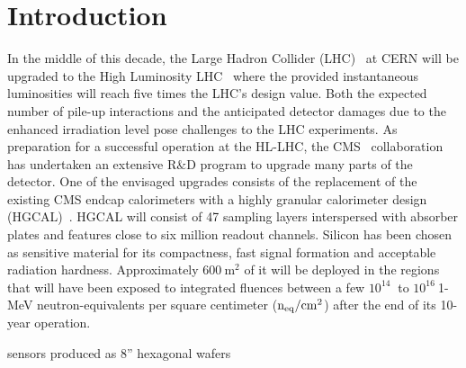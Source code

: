 \section{Introduction}
\label{sec:introduction}
In the middle of this decade, the Large Hadron Collider (LHC)~\cite{evans:2008} at CERN will be upgraded to the High Luminosity LHC~\cite{hl-lhc-tdr:2017} where the provided instantaneous luminosities will reach five times the LHC's design value.
Both the expected number of pile-up interactions and the anticipated detector damages due to the enhanced irradiation level pose challenges to the LHC experiments.\newline
As preparation for a successful operation at the HL-LHC, the CMS~\cite{cms:2008} collaboration has undertaken an extensive R$\&$D program to upgrade many parts of the detector.
One of the envisaged upgrades consists of the replacement of the existing CMS endcap calorimeters with a highly granular calorimeter design (HGCAL)~\cite{hgcal-tdr:2018}.
HGCAL will consist of 47 sampling layers interspersed with absorber plates and features close to six million readout channels.
Silicon has been chosen as sensitive material for its compactness, fast signal formation and acceptable radiation hardness.
Approximately $\SI{600}{\metre\squared}$ of it will be deployed in the regions that will have been exposed to integrated fluences between a few $10^{14}~$ to $10^{16}~$1-MeV neutron-equivalents per square centimeter ($\mathrm{n_{eq}}/\mathrm{cm}^{2}$) after the end of its 10-year operation. 

sensors produced as 8'' hexagonal wafers~\cite{cms_hgc-2016-beamtests,H1:2020,H2:2020,Curr_s_2017}






